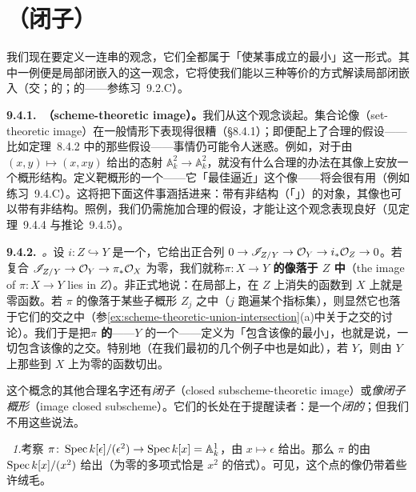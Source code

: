 
\section{（闭子）\trSchemeTheoreticImage{}}

我们现在要定义一连串的观念，它们全都属于「使某事成立的最小\trClosedSubscheme」这一形式。其中一例便是局部闭嵌入的\trSchemeTheoretic\trClosure{}这一观念，它将使我们能以三种等价的方式解读局部闭嵌入（\trOpenSubscheme{}交\trClosedSubscheme；\trClosedSubscheme{}的\trOpenSubscheme；\trOpenSubscheme{}的\trClosedSubscheme——参\mbox{练习~9.2.C}）。

\textbf{9.4.1.\ \trSchemeTheoretic\trImage{}（scheme-theoretic image）。}\quad 我们从\trSchemeTheoreticImage{}这个观念谈起。集合论像（set-theoretic image）在一般情形下表现得很糟（\S8.4.1）；即便配上了合理的假设——比如\trChevalley{}定理~8.4.2 中的那些假设——事情仍可能令人迷惑。例如，对于由 $(x,y)\mapsto(x,xy)$ 给出的态射 $\mathbb{A}^2_k\to\mathbb{A}^2_k$，就没有什么合理的办法在其像上安放一个概形结构。定义靶概形的一个\trClosedSubscheme{}——它「最佳逼近」这个像——将会很有用（例如\mbox{练习~9.4.C}）。这将把下面这件事涵括进来：带有非\trReduced{}结构（「\trFuzz」）的对象，其像也可以带有非\trReduced{}结构。照例，我们仍需施加合理的假设，才能让这个观念表现良好（见定理~9.4.4 与推论~9.4.5）。

\textbf{9.4.2.}\ \emph{\trhDefinition{}。}\quad 设 $i\colon Z\hookrightarrow Y$ 是一个\trClosedSubscheme，它给出正合列 $0\to\mathscr{I}_{Z/Y}\to\mathcal{O}_Y\to i_*\mathcal{O}_Z\to 0$。若复合 $\mathscr{I}_{Z/Y}\to\mathcal{O}_Y\to\pi_*\mathcal{O}_X$ 为零，我们就称\textbf{$\pi\colon X\to Y$ 的像落于 $Z$ 中}（the image of $\pi\colon X\to Y$ lies in $Z$）。非正式地说：在局部上，在 $Z$ 上消失的函数\trPullback{}到 $X$ 上就是零函数。若 $\pi$ 的像落于某些子概形 $Z_j$ 之中（$j$ 跑遍某个指标集），则显然它也落于它们的交之中（参\cref{ex:scheme-theoretic-union-intersection}(a)中关于\trClosedSubscheme{}之交的讨论）。我们于是把\textbf{$\pi$ 的\trSchemeTheoretic\trImage{}}——$Y$ 的一个\trClosedSubscheme——定义为「包含该像的最小\trClosedSubscheme」，也就是说，一切包含该像的\trClosedSubscheme{}之交。特别地（在我们最初的几个例子中也是如此），若 $Y$\trAffine，则\trSchemeTheoreticImage{}由 $Y$ 上那些\trPullback{}到 $X$ 上为零的函数切出。

这个概念的其他合理名字还有\emph{闭子\trSchemeTheoreticImage{}}（closed subscheme-theoretic image）或\emph{像闭子概形}（image closed subscheme）。它们的长处在于提醒读者：\trSchemeTheoreticImage{}是一个\emph{闭的}\trSubscheme；但我们不用这些说法。

\emph{\trhExample{}~1.}\quad 考察 $\pi\colon\operatorname{Spec} k[\epsilon]/(\epsilon^2)\to\operatorname{Spec} k[x]=\mathbb{A}^1_k$，由 $x\mapsto\epsilon$ 给出。那么 $\pi$ 的\trSchemeTheoreticImage{}由 $\operatorname{Spec} k[x]/(x^2)$ 给出（\trPullback{}为零的多项式恰是 $x^2$ 的倍式）。可见，这个\trFuzz{}点的像仍带着些许绒毛。


